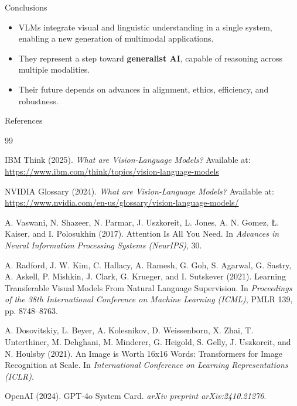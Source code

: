 \documentclass[aspectratio=169]{beamer}
\begin{document}
	\begin{frame}{Conclusions}
		\begin{itemize}
			\item VLMs integrate visual and linguistic understanding in a single system, enabling a new generation of multimodal applications.
			\item They represent a step toward \textbf{generalist AI}, capable of reasoning across multiple modalities.
			\item Their future depends on advances in alignment, ethics, efficiency, and robustness.
		\end{itemize}
	\end{frame}
	
	\begin{frame}[allowframebreaks]{References}
		\scriptsize
		\begin{thebibliography}{99}
			
			 IBM Think (2025). \textit{What are Vision-Language Models?} Available at: \url{https://www.ibm.com/think/topics/vision-language-models}
			
			 NVIDIA Glossary (2024). \textit{What are Vision-Language Models?} Available at: \url{https://www.nvidia.com/en-us/glossary/vision-language-models/}
			
			 A. Vaswani, N. Shazeer, N. Parmar, J. Uszkoreit, L. Jones, A. N. Gomez, Ł. Kaiser, and I. Polosukhin (2017). Attention Is All You Need. In \textit{Advances in Neural Information Processing Systems (NeurIPS)}, 30.
			
			 A. Radford, J. W. Kim, C. Hallacy, A. Ramesh, G. Goh, S. Agarwal, G. Sastry, A. Askell, P. Mishkin, J. Clark, G. Krueger, and I. Sutskever (2021). Learning Transferable Visual Models From Natural Language Supervision. In \textit{Proceedings of the 38th International Conference on Machine Learning (ICML)}, PMLR 139, pp. 8748--8763.
			
			 A. Dosovitskiy, L. Beyer, A. Kolesnikov, D. Weissenborn, X. Zhai, T. Unterthiner, M. Dehghani, M. Minderer, G. Heigold, S. Gelly, J. Uszkoreit, and N. Houlsby (2021). An Image is Worth 16x16 Words: Transformers for Image Recognition at Scale. In \textit{International Conference on Learning Representations (ICLR)}.
			
			 OpenAI (2024). GPT-4o System Card. \textit{arXiv preprint arXiv:2410.21276}.
			

\end{thebibliography}
\end{frame}
\end{document}
